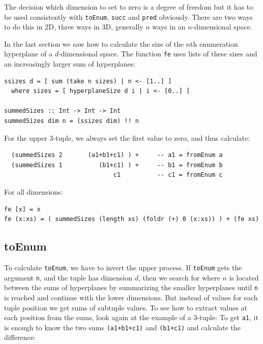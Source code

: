 \documentclass{tmr}
\newcommand{\authornote}[3]{{\color{#2} {\sc #1}: #3}}
\newcommand\bay[1]{\authornote{edward}{blue}{#1}}
\begin{document}
The decision which dimension to set to zero is a degree of freedom but it has to be used consistently with \verb|toEnum|, \verb|succ| and \verb|pred| obviously. There are two ways to do this in 2D, three ways in 3D, generally $n$ ways in an $n$-dimensional space. %

In the last section we saw how to calculate the size of the $n$th enumeration hyperplane of a $d$-dimensional space. The function \verb|fe| uses lists of these sizes and an increasingly larger sum of hyperplanes:

\begin{Verbatim}
ssizes d = [ sum (take n sizes) | n <- [1..] ]
  where sizes = [ hyperplaneSize d i | i <- [0..] ]

summedSizes :: Int -> Int -> Int
summedSizes dim n = (ssizes dim) !! n
\end{Verbatim}

For the upper 3-tuple, we always set the first value to zero, and thus calculate:

\begin{Verbatim}
  (summedSizes 2       (a1+b1+c1) ) +     -- a1 = fromEnum a
  (summedSizes 1          (b1+c1) ) +     -- b1 = fromEnum b
                              c1          -- c1 = fromEnum c
\end{Verbatim}

For all dimensions:
\begin{Verbatim}
fe [x] = x
fe (x:xs) = ( summedSizes (length xs) (foldr (+) 0 (x:xs)) ) + (fe xs)
\end{Verbatim}

\subsection {toEnum }
To calculate \verb|toEnum|, we have to invert the upper process. If \verb|toEnum| gets the argument \verb|n|, and the tuple has dimension $d$, then we search for where $n$ is located between the sums of hyperplanes by summarizing the  smaller hyperplanes until \verb|n| is reached and continue with the lower dimensions. But instead of values for each tuple position we get sums of subtuple values. To see how to extract values at each position from the sums, look again at the example of a 3-tuple: To get \verb|a1|, it is enough to know the two sums \verb|(a1+b1+c1)| and \verb|(b1+c1)| and calculate the difference:
\end{document}
